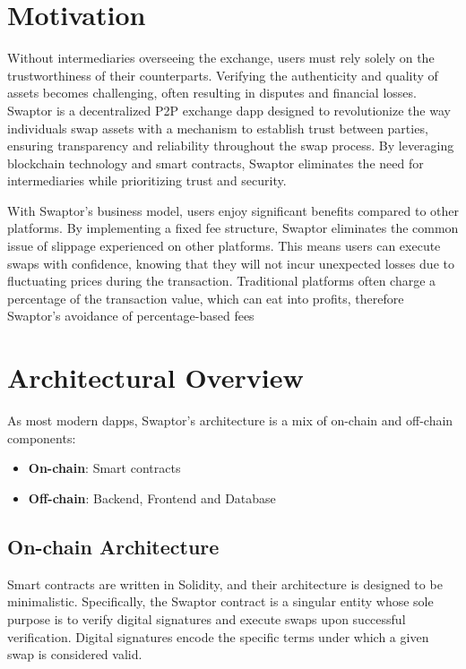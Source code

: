 \documentclass[12pt]{article}
\begin{document}
\newpage

\section{Motivation}

Without intermediaries overseeing the exchange, users must rely solely on the trustworthiness of their
counterparts. Verifying the authenticity and quality of assets becomes challenging, often resulting
in disputes and financial losses. Swaptor is a decentralized P2P exchange dapp designed to revolutionize
the way individuals swap assets with a mechanism to establish trust between parties, ensuring transparency
and reliability throughout the swap process. By leveraging blockchain technology and smart contracts,
Swaptor eliminates the need for intermediaries while prioritizing trust and security.

With Swaptor's business model, users enjoy significant benefits compared to other platforms. By implementing
a fixed fee structure, Swaptor eliminates the common issue of slippage experienced on other platforms.
This means users can execute swaps with confidence, knowing that they will not incur unexpected losses due
to fluctuating prices during the transaction. Traditional platforms often charge a percentage of the transaction value,
which can eat into profits, therefore Swaptor's avoidance of percentage-based fees

\newpage

\section{Architectural Overview} \label{form}
\indent As most modern dapps, Swaptor's architecture is a mix of on-chain and off-chain components:
\begin{itemize}
  \item \textbf{On-chain}: Smart contracts
  \item \textbf{Off-chain}: Backend, Frontend and Database
\end{itemize}

\subsection{On-chain Architecture}

\indent Smart contracts are written in Solidity, and their architecture is designed to be minimalistic.
Specifically, the Swaptor contract is a singular entity whose sole purpose is to verify digital signatures
and execute swaps upon successful verification. Digital signatures encode the specific terms under which a given swap is considered valid.
\end{document}
